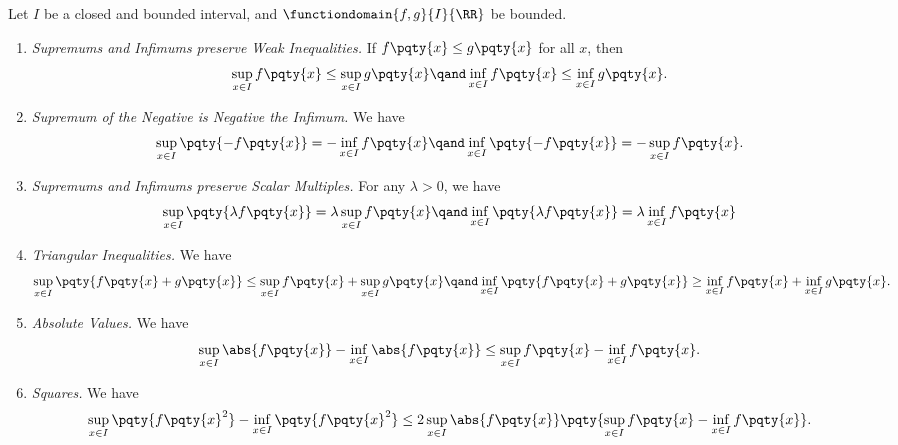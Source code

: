 \begin{lemma}
    \label{lem:properties-supremum-infimum}%
    Let \(I\) be a closed and bounded interval, and \(\functiondomain{f, g}{I}{\RR}\) be bounded.

    \begin{enumerate}
        \item \textit{Supremums and Infimums preserve Weak Inequalities.} If \(f\pqty{x} \leq g\pqty{x}\) for all \(x\), then
        \[
            \sup_{x \in I} f\pqty{x} \leq \sup_{x \in I} g\pqty{x}
            \qand
            \inf_{x \in I} f\pqty{x} \leq \inf_{x \in I} g\pqty{x}.
        \]
        \item \textit{Supremum of the Negative is Negative the Infimum.} We have
        \[
            \sup_{x \in I} \pqty{-f\pqty{x}} = -\inf_{x \in I} f\pqty{x}
            \qand
            \inf_{x \in I} \pqty{-f\pqty{x}} = -\sup_{x \in I} f\pqty{x}.
        \]

        \item \textit{Supremums and Infimums preserve Scalar Multiples.} For any \(\lambda > 0\), we have
        \[
            \sup_{x \in I} \pqty{\lambda f\pqty{x}} = \lambda \sup_{x \in I} f\pqty{x}
            \qand
            \inf_{x \in I} \pqty{\lambda f\pqty{x}} = \lambda \inf_{x \in I} f\pqty{x}
        \]

        \item \textit{Triangular Inequalities.} We have
        \[
            \sup_{x \in I} \pqty{f\pqty{x} + g\pqty{x}} \leq \sup_{x \in I} f\pqty{x} + \sup_{x \in I} g\pqty{x}
            \qand
            \inf_{x \in I} \pqty{f\pqty{x} + g\pqty{x}} \geq \inf_{x \in I} f\pqty{x} + \inf_{x \in I} g\pqty{x}.
        \]
        
        \item \textit{Absolute Values.} We have
        \[
            \sup_{x \in I} \abs{f\pqty{x}} - \inf_{x \in I} \abs{f\pqty{x}} \leq \sup_{x \in I} f\pqty{x} - \inf_{x \in I} f\pqty{x}.
        \]

        \item \textit{Squares.} We have
        \[
            \sup_{x \in I} \pqty{f\pqty{x}^2} - \inf_{x \in I} \pqty{f\pqty{x}^2} \leq 2 \sup_{x \in I} \abs{f\pqty{x}} \pqty{\sup_{x \in I} f\pqty{x} - \inf_{x \in I} f\pqty{x}}.
        \]
    \end{enumerate}
\end{lemma}

